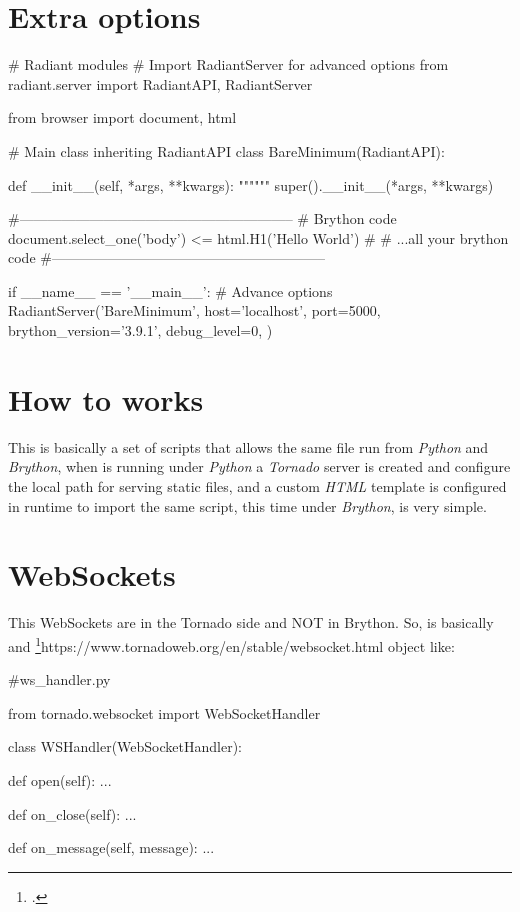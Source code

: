 \section{Extra options}
\begin{python}
# Radiant modules
# Import RadiantServer for advanced options
from radiant.server import RadiantAPI, RadiantServer  

from browser import document, html

# Main class inheriting RadiantAPI
class BareMinimum(RadiantAPI):

    def __init__(self, *args, **kwargs):
        """"""
        super().__init__(*args, **kwargs)

        #-----------------------------------------------------------
        # Brython code
        document.select_one('body') <= html.H1('Hello World')
        #
        # ...all your brython code
        #-----------------------------------------------------------

if __name__ == '__main__':
    # Advance options
    RadiantServer('BareMinimum',
                  host='localhost',
                  port=5000,
                  brython_version='3.9.1',
                  debug_level=0,
                  )
\end{python}


\section{How to works}
This is basically a set of scripts that allows the same file run from \textit{Python} and \textit{Brython}, when is running under \textit{Python} a \textit{Tornado} server is created and configure the local path for serving static files, and a custom \textit{HTML} template is configured in runtime to import the same script, this time under \textit{Brython}, is very simple.


\section{WebSockets}
This WebSockets are in the Tornado side and NOT in Brython. So, is basically and \footcite{WebSocketHandler}{https://www.tornadoweb.org/en/stable/websocket.html} object like:

\begin{python}
#ws_handler.py

from tornado.websocket import WebSocketHandler

class WSHandler(WebSocketHandler):

    def open(self):
        ...

    def on_close(self):
        ...

    def on_message(self, message):
        ...
\end{python}

